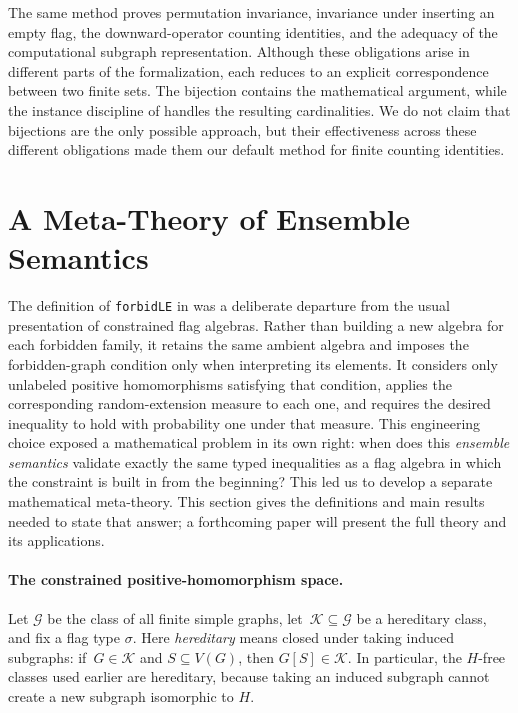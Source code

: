 \documentclass{article}
\newcommand{\lean}[1]{\texttt{#1}}
\begin{document}
The same method proves permutation invariance, invariance under inserting an
empty flag, the downward-operator counting identities, and the adequacy of
the computational subgraph representation.  Although these obligations arise
in different parts of the formalization, each reduces to an explicit
correspondence between two finite sets.  The bijection contains the
mathematical argument, while the instance discipline of
 handles the resulting cardinalities.  We do not claim
that bijections are the only possible approach, but their effectiveness
across these different obligations made them our default method for finite
counting identities.

\section{A Meta-Theory of Ensemble Semantics}
\label{sec:metatheory}

The definition of \lean{forbidLE} in  was a deliberate
departure from the usual presentation of constrained flag algebras.  Rather
than building a new algebra for each forbidden family, it retains the same
ambient algebra and imposes the forbidden-graph condition only when
interpreting its elements.  It considers only unlabeled positive
homomorphisms satisfying that condition, applies the corresponding
random-extension measure to each one, and requires the desired inequality to
hold with probability one under that measure.
This engineering choice exposed a mathematical problem in its own right:
when does this \emph{ensemble semantics} validate exactly the same typed
inequalities as a flag algebra in which the constraint is built in from the
beginning?  This led us to develop a separate mathematical meta-theory.
This section gives the definitions and main results needed to state that answer;
a forthcoming paper will present the full theory and its applications.

\paragraph{The constrained positive-homomorphism space.}
Let \(\mathcal G\) be the class of all finite simple graphs, let~\(\mathcal K\subseteq\mathcal G\) be a hereditary class, and fix a flag type
\(\sigma\).  Here \emph{hereditary} means closed under taking induced
subgraphs: if~\(G\in\mathcal K\) and \(S\subseteq V(G)\), then
\(G[S]\in\mathcal K\).  In particular, the \(H\)-free classes used earlier are
hereditary, because taking an induced subgraph cannot create a new
subgraph isomorphic to \(H\).
\end{document}
